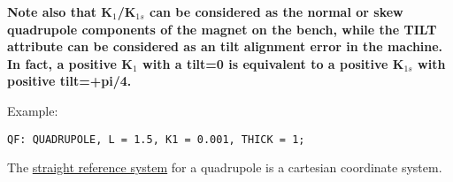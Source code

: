 \textbf{ Note also that K$_1$/K$_{1s}$ can be considered as
  the normal or skew quadrupole components of the magnet on
  the bench, while the TILT attribute can be considered as an
  tilt alignment error in the machine. In fact, a positive
  K$_1$ with a tilt=0 is equivalent to a positive K$_{1s}$
  with positive tilt=+pi/4. } 

Example: 
\begin{verbatim}
QF: QUADRUPOLE, L = 1.5, K1 = 0.001, THICK = 1;
\end{verbatim}     

The \href{local_system.html#straight}{straight reference system} for
a quadrupole is a cartesian coordinate system.

